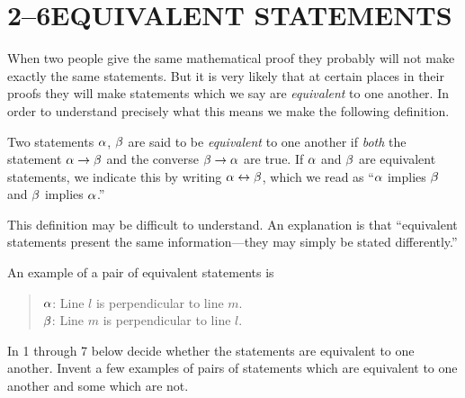 \documentclass[11pt]{book}
\begin{document}
\section*{2--6\quad EQUIVALENT STATEMENTS}

When two people give the same mathematical proof they probably will not make
exactly the same statements. But it is very likely that at certain places in their
proofs they will make statements which we say are \emph{equivalent} to one
another. In order to understand precisely what this means we make the following
definition.

\begin{definition}
Two statements $\alpha$, $\beta$ are said to be \emph{equivalent} to one another if
\emph{both} the statement $\alpha \rightarrow \beta$ and the converse $\beta \rightarrow \alpha$ are true.
If $\alpha$ and $\beta$ are equivalent statements, we indicate this by writing
$\alpha \leftrightarrow \beta$, which we read as ``$\alpha$ implies $\beta$ and $\beta$ implies $\alpha$.''
\end{definition}

This definition may be difficult to understand. An explanation is that
``equivalent statements present the same information---they may simply be stated
differently.''

An example of a pair of equivalent statements is

\begin{quote}
$\alpha$: Line $l$ is perpendicular to line $m$.\\
$\beta$: Line $m$ is perpendicular to line $l$.
\end{quote}


In 1 through 7 below decide whether the statements are equivalent to one another.
Invent a few examples of pairs of statements which are equivalent to one another
and some which are not.
\end{document}
